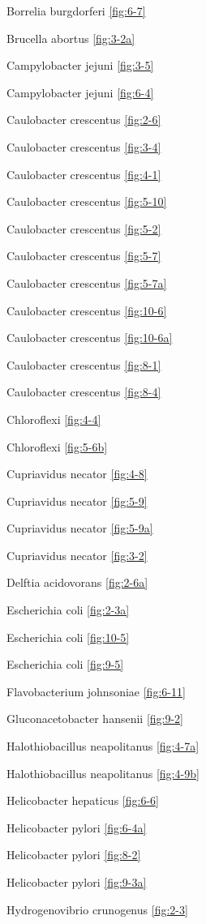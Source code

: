 \documentclass[]{tufte-book}
\begin{document}
Borrelia burgdorferi \ref{fig:6-7}

Brucella abortus \ref{fig:3-2a}

Campylobacter jejuni \ref{fig:3-5}

Campylobacter jejuni \ref{fig:6-4}

Caulobacter crescentus \ref{fig:2-6}

Caulobacter crescentus \ref{fig:3-4}

Caulobacter crescentus \ref{fig:4-1}

Caulobacter crescentus \ref{fig:5-10}

Caulobacter crescentus \ref{fig:5-2}

Caulobacter crescentus \ref{fig:5-7}

Caulobacter crescentus \ref{fig:5-7a}

Caulobacter crescentus \ref{fig:10-6}

Caulobacter crescentus \ref{fig:10-6a}

Caulobacter crescentus \ref{fig:8-1}

Caulobacter crescentus \ref{fig:8-4}

Chloroflexi \ref{fig:4-4}

Chloroflexi \ref{fig:5-6b}

Cupriavidus necator \ref{fig:4-8}

Cupriavidus necator \ref{fig:5-9}

Cupriavidus necator \ref{fig:5-9a}

Cupriavidus necator \ref{fig:3-2}

Delftia acidovorans \ref{fig:2-6a}

Escherichia coli \ref{fig:2-3a}

Escherichia coli \ref{fig:10-5}

Escherichia coli \ref{fig:9-5}

Flavobacterium johnsoniae \ref{fig:6-11}

Gluconacetobacter hansenii \ref{fig:9-2}

Halothiobacillus neapolitanus \ref{fig:4-7a}

Halothiobacillus neapolitanus \ref{fig:4-9b}

Helicobacter hepaticus \ref{fig:6-6}

Helicobacter pylori \ref{fig:6-4a}

Helicobacter pylori \ref{fig:8-2}

Helicobacter pylori \ref{fig:9-3a}

Hydrogenovibrio crunogenus \ref{fig:2-3}
\end{document}

